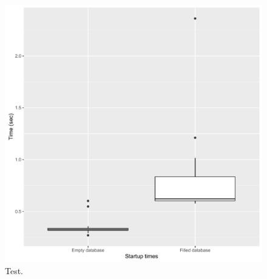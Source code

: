 \begin{figure}[!h]
	\centering
	\includegraphics[width=0.6\columnwidth]{images/experiments/startup}
	\caption{Test.}
	\label{fig:startup_experiment}
\end{figure}

